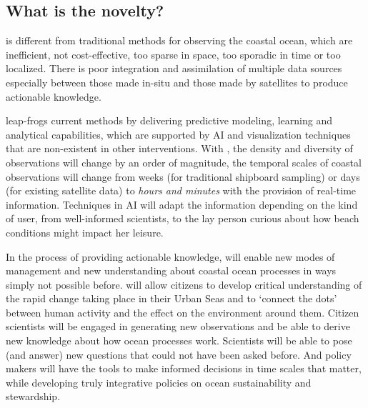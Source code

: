 \documentclass[12pt]{article}
\begin{document}


\vspace*{0.1cm}
\subsection{What is the novelty?}

\pro is different from traditional methods for observing the coastal
ocean, which are inefficient, not cost-effective, too sparse in space,
too sporadic in time or too localized. There is poor integration and
assimilation of multiple data sources especially between those made
in-situ and those made by satellites to produce actionable knowledge.

\pro leap-frogs current methods by delivering predictive modeling,
learning and analytical capabilities, which are supported by AI and
visualization techniques that are non-existent in other interventions.
With \proe, the density and diversity of observations will change by an
order of magnitude, the temporal scales of coastal observations will
change from weeks (for traditional shipboard sampling) or days (for
existing satellite data) to \emph{hours and minutes} with the
provision of real-time information. Techniques in AI will adapt the
information depending on the kind of user, from well-informed
scientists, to the lay person curious about how beach conditions might
impact her leisure. 


In the process of providing actionable knowledge, \pro will enable new
modes of management and new understanding about coastal ocean
processes in ways simply not possible before. \pro will allow citizens
to develop critical understanding of the rapid change taking place in
their Urban Seas and to ‘connect the dots’ between human activity and
the effect on the environment around them. Citizen scientists will be
engaged in generating new observations and be able to derive new
knowledge about how ocean processes work. Scientists will be able to
pose (and answer) new questions that could not have been asked
before. And policy makers will have the tools to make informed
decisions in time scales that matter, while developing truly
integrative policies on ocean sustainability and
stewardship. %
\end{document}
